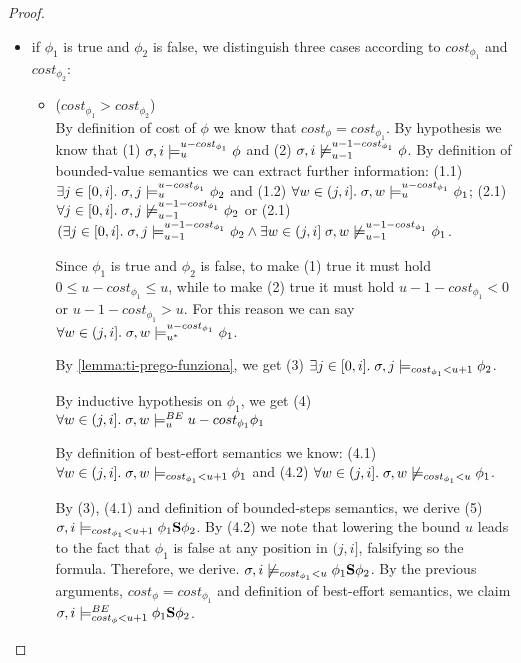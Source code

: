 \begin{theorem}
\begin{proof}
\begin{itemize}
\begin{itemize}
        \item if $\phi_1$ is true and $\phi_2$ is false, we distinguish three cases according to $cost_{\phi_1}$ and $cost_{\phi_2}$:
        \begin{itemize}
            \item ($cost_{\phi_1} > cost_{\phi_2}$) \\
            By definition of cost of $\phi$ we know that $cost_\phi = cost_{\phi_1}$.
            By hypothesis we know that 
            (1) $\sigma, i \models_{u}^{u-cost_{\phi_1}} \phi$ and 
            (2) $\sigma, i \not\models_{u-1}^{u-1-cost_{\phi_1}} \phi$.
            By definition of bounded-value semantics we can extract further information:
            (1.1) $\exists j \in [0,i].\; \sigma,j \models_{u}^{u-cost_{\phi_1}} \phi_2$ and 
            (1.2) $\forall w \in (j,i].\; \sigma,w \models_{u}^{u-cost_{\phi_1}} \phi_1$;
            (2.1) $\forall j \in [0,i].\; \sigma,j \not\models_{u-1}^{u-1-cost_{\phi_1}} \phi_2$ or
            (2.1) $(\exists j \in [0,i].\; \sigma,j \models_{u-1}^{u-1-cost_{\phi_1}} \phi_2 \land \exists w \in (j,i]\; \sigma,w \not\models_{u-1}^{u-1-cost_{\phi_1}} \phi_1$.

            Since $\phi_1$ is true and $\phi_2$ is false, to make (1) true it must hold $0 \leq u-cost_{\phi_1} \leq u$, while to make (2) true it must hold $u-1-cost_{\phi_1} < 0$ or $u-1-cost_{\phi_1} > u$.
            For this reason we can say $\forall w \in (j,i].\; \sigma,w \models_{{u}^*}^{u-cost_{\phi_1}} \phi_1$.
            
            By \autoref{lemma:ti-prego-funziona}, we get (3) $\exists j \in [0,i].\; \sigma,j \models_{cost_{\phi_1} < u + 1} \phi_2$.

            By inductive hypothesis on $\phi_1$, we get (4) $\forall w \in (j,i].\; \sigma,w \models_{u}^{BE}{u-cost_{\phi_1}} \phi_1$

            By definition of best-effort semantics we know: (4.1) $\forall w \in (j,i].\; \sigma,w \models_{cost_{\phi_1} < u + 1} \phi_1$ and (4.2) $\forall w \in (j,i].\; \sigma,w \not\models_{cost_{\phi_1} < u} \phi_1$.

            By (3), (4.1) and definition of bounded-steps semantics, we derive (5) $\sigma,i \models_{cost_{\phi_1} < u + 1} \phi_1 \mathbf{S} \phi_2$.
            By (4.2) we note that lowering the bound $u$ leads to the fact that $\phi_1$ is false at any position in $(j,i]$, falsifying so the formula.
            Therefore, we derive. $\sigma,i \not\models_{cost_{\phi_1} < u} \phi_1 \mathbf{S} \phi_2$.
            By the previous arguments, $cost_\phi = cost_{\phi_1}$ and definition of best-effort semantics, we claim $\sigma,i \models_{cost_\phi < u + 1}^{BE} \phi_1 \mathbf{S} \phi_2$.


\end{itemize}
\end{itemize}
\end{itemize}
\end{proof}
\end{theorem}
